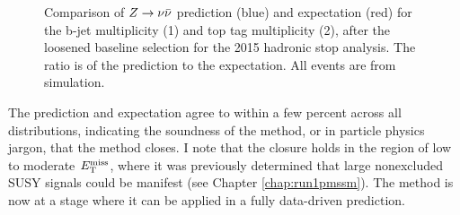 \begin{figure}[h]
\centering
{}
\caption{Comparison of $Z\rightarrow \nu\bar{\nu}$ prediction (blue) and expectation (red) for the b-jet multiplicity (1) and top tag multiplicity (2), after the loosened baseline selection for the 2015 hadronic stop analysis. The ratio is of the prediction to the expectation. All events are from simulation.}
\label{fig:ZInvCR_NbNt}
\end{figure}
\FloatBarrier
\noindent
The prediction and expectation agree to within a few percent across all distributions, indicating the soundness of the method, or in particle physics jargon, that the method closes. I note that the closure holds in the region of low to moderate $E_{\text{T}}^{\rm miss}$, where it was previously determined that large nonexcluded SUSY signals could be manifest (see Chapter \ref{chap:run1pmssm}). The method is now at a stage where it can be applied in a fully data-driven prediction. 


